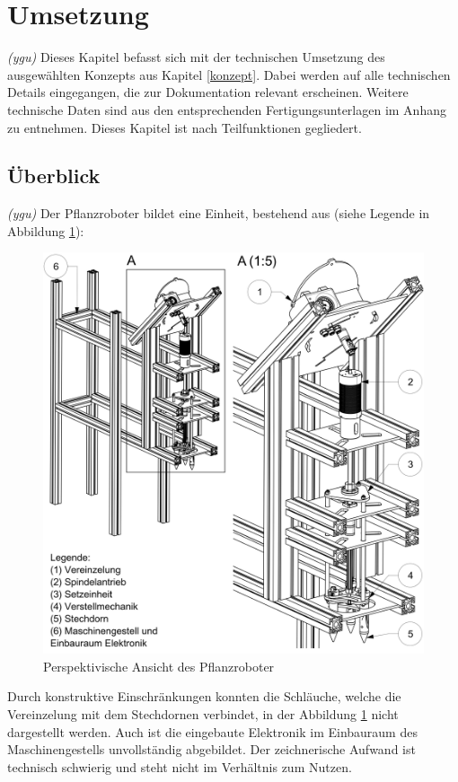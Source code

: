\newpage
\section{Umsetzung} 
\label{kap:Umsetzung}
\textit{(ygu)} Dieses Kapitel befasst sich mit der technischen Umsetzung des ausgewählten Konzepts aus Kapitel \ref{konzept}. Dabei werden auf alle technischen Details eingegangen, die zur Dokumentation relevant erscheinen. Weitere technische Daten sind aus den entsprechenden Fertigungsunterlagen im Anhang zu entnehmen. Dieses Kapitel ist nach Teilfunktionen gegliedert. 
\subsection{Überblick}
\textit{(ygu)} Der Pflanzroboter bildet eine Einheit, bestehend aus (siehe Legende in Abbildung \ref{fig:uberblick}):
	\begin{figure}[H]
	\includegraphics[scale=0.75]{Illustrationen/6-Umsetzung/uberblick.jpg}
	\caption{Perspektivische Ansicht des Pflanzroboter}
	\label{fig:uberblick}
	\end{figure}
Durch konstruktive Einschränkungen konnten die Schläuche, welche die Vereinzelung mit dem Stechdornen verbindet, in der Abbildung \ref{fig:uberblick} nicht dargestellt werden. Auch ist die eingebaute Elektronik im Einbauraum des Maschinengestells unvollständig abgebildet. Der zeichnerische Aufwand ist technisch schwierig und steht nicht im Verhältnis zum Nutzen. 
